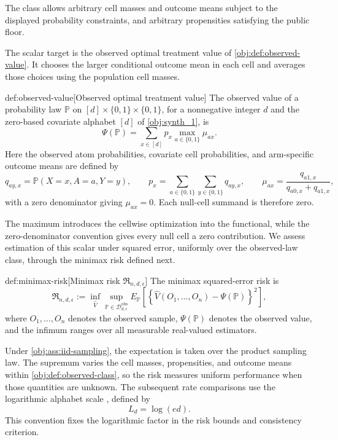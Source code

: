 The class allows arbitrary cell masses and outcome means subject to the displayed probability constraints, and arbitrary propensities satisfying the public floor.

The scalar target is the observed optimal treatment value  of \cref{obj:def:observed-value}. It chooses the larger conditional outcome mean in each cell and averages those choices using the population cell masses.

\begin{definitionv}{def:observed-value}[Observed optimal treatment value]
The observed value of a probability law \(\mathbb P\) on \([d]\times\{0,1\}\times\{0,1\}\), for a nonnegative integer \(d\) and the zero-based covariate alphabet \([d]\) of \cref{obj:synth_1}, is
\[
\Psi(\mathbb P)
=\sum_{x\in[d]}p_x\max_{a\in\{0,1\}}\mu_{ax}.
\]
Here the observed atom probabilities, covariate cell probabilities, and arm-specific outcome means are defined by
\[
q_{ay,x}=\mathbb P(X=x,A=a,Y=y),
\qquad
p_x=\sum_{a\in\{0,1\}}\sum_{y\in\{0,1\}}q_{ay,x},
\qquad
\mu_{ax}=\frac{q_{a1,x}}{q_{a0,x}+q_{a1,x}},
\]
with a zero denominator giving \(\mu_{ax}=0\). Each null-cell summand is therefore zero.
\end{definitionv}

The maximum introduces the cellwise optimization into the functional, while the zero-denominator convention gives every null cell a zero contribution. We assess estimation of this scalar under squared error, uniformly over the observed-law class, through the minimax risk  defined next.

\begin{definitionv}{def:minimax-risk}[Minimax risk \(\mathfrak R_{n,d,\epsilon}\)]
The minimax squared-error risk is
\[
\mathfrak R_{n,d,\epsilon}
:=
\inf_{\widehat V}
\sup_{\mathbb P\in\mathcal D_{d,\epsilon}^{\mathrm{obs}}}
E_{\mathbb P}
\left[
\left\{
\widehat V(O_1,\ldots,O_n)-\Psi(\mathbb P)
\right\}^{2}
\right],
\]
where \(O_1,\ldots,O_n\) denotes the observed sample, \(\Psi(\mathbb P)\) denotes the observed value, and the infimum ranges over all measurable real-valued estimators.
\end{definitionv}

Under \cref{obj:ass:iid-sampling}, the expectation is taken over the product sampling law. The supremum varies the cell masses, propensities, and outcome means within \cref{obj:def:observed-class}, so the risk measures uniform performance when those quantities are unknown. The subsequent rate comparisons use the logarithmic alphabet scale , defined by
\[
L_d=\log(ed).
\]
This convention fixes the logarithmic factor in the risk bounds and consistency criterion.

